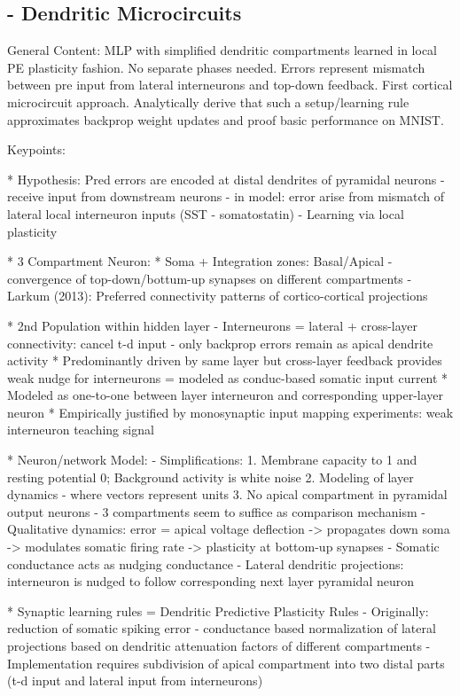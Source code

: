 \documentclass{article}
\theoremstyle{definition}
\begin{document}
\subsection*{\citet{sacramento2018} - Dendritic Microcircuits}

General Content: MLP with simplified dendritic compartments learned in local PE plasticity fashion. No separate phases needed. Errors represent mismatch between pre input from lateral interneurons and top-down feedback. First cortical microcircuit approach. Analytically derive that such a setup/learning rule approximates backprop weight updates and proof basic performance on MNIST.


Keypoints:

* Hypothesis: Pred errors are encoded at distal dendrites of pyramidal neurons - receive input from downstream neurons - in model: error arise from mismatch of lateral local interneuron inputs (SST - somatostatin) - Learning via local plasticity

* 3 Compartment Neuron:
    * Soma + Integration zones: Basal/Apical - convergence of top-down/bottum-up synapses on different compartments - Larkum (2013): Preferred connectivity patterns of cortico-cortical projections

* 2nd Population within hidden layer - Interneurons = lateral + cross-layer connectivity: cancel t-d input - only backprop errors remain as apical dendrite activity
    * Predominantly driven by same layer but cross-layer feedback provides weak nudge for interneurons = modeled as conduc-based somatic input current
    * Modeled as one-to-one between layer interneuron and corresponding upper-layer neuron
    * Empirically justified by monosynaptic input mapping experiments: weak interneuron teaching signal

* Neuron/network Model:
    - Simplifications:
        1. Membrane capacity to 1 and resting potential 0; Background activity is white noise
        2. Modeling of layer dynamics - where vectors represent units
        3. No apical compartment in pyramidal output neurons - 3 compartments seem to suffice as comparison mechanism
    - Qualitative dynamics: error = apical voltage deflection -> propagates down soma -> modulates somatic firing rate -> plasticity at bottom-up synapses
    - Somatic conductance acts as nudging conductance
    - Lateral dendritic projections: interneuron is nudged to follow corresponding next layer pyramidal neuron

* Synaptic learning rules = Dendritic Predictive Plasticity Rules
    - Originally: reduction of somatic spiking error
    - conductance based normalization of lateral projections based on dendritic attenuation factors of different compartments
    - Implementation requires subdivision of apical compartment into two distal parts (t-d input and lateral input from interneurons)
\end{document}
